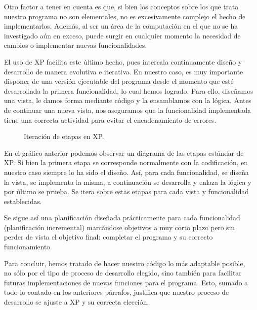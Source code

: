 Otro factor a tener en cuenta es que, si bien los conceptos sobre los que trata nuestro programa no son elementales, no es excesivamente complejo el hecho de implementarlos. Además, al ser un área de la computación en el que no se ha investigado aún en exceso, puede surgir en cualquier momento la necesidad de cambios o implementar nuevas funcionalidades.

El uso de XP facilita este último hecho, pues intercala continuamente diseño y desarrollo de manera evolutiva e iterativa. En nuestro caso, es muy importante disponer de una versión ejecutable del programa desde el momento que esté desarrollada la primera funcionalidad, lo cual hemos logrado. Para ello, diseñamos una vista, le damos forma mediante código y la ensamblamos con la lógica. Antes de continuar una nueva vista, nos aseguramos que la funcionalidad implementada tiene una correcta actividad para evitar el encadenamiento de errores.

\begin{figure}[!h]
\begin{center}
\end{center}
\caption{Iteración de etapas en XP.}
\end{figure}

En el gráfico anterior podemos observar un diagrama de las etapas estándar de XP. Si bien la primera etapa se corresponde normalmente con la codificación, en nuestro caso siempre lo ha sido el diseño. Así, para cada funcionalidad, se diseña la vista, se implementa la misma, a continuación se desarrolla y enlaza la lógica y por último se prueba. Se itera sobre estas etapas para cada vista y funcionalidad establecidas.

Se sigue así una planificación diseñada prácticamente para cada funcionalidad (planificación incremental) marcándose objetivos a muy corto plazo pero sin perder de vista el objetivo final: completar el programa y su correcto funcionamiento.

Para concluir, hemos tratado de hacer nuestro código lo más adaptable posible, no sólo por el tipo de proceso de desarrollo elegido, sino también para facilitar futuras implementaciones de nuevas funciones para el programa. Esto, sumado a todo lo contado en los anteriores párrafos, justifica que nuestro proceso de desarrollo se ajuste a XP y su correcta elección.